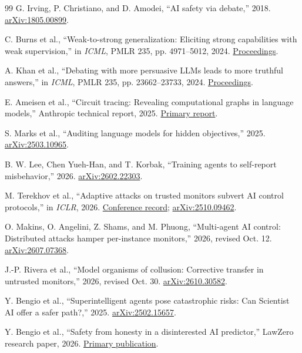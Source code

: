 \documentclass[10pt,twocolumn,letterpaper]{article}
\begin{document}
\begin{thebibliography}{99}
 G. Irving, P. Christiano, and D. Amodei, ``AI safety via debate,'' 2018. \href{https://arxiv.org/abs/1805.00899}{arXiv:1805.00899}.

 C. Burns et al., ``Weak-to-strong generalization: Eliciting strong capabilities with weak supervision,'' in \emph{ICML}, PMLR 235, pp. 4971--5012, 2024. \href{https://proceedings.mlr.press/v235/burns24b.html}{Proceedings}.

 A. Khan et al., ``Debating with more persuasive LLMs leads to more truthful answers,'' in \emph{ICML}, PMLR 235, pp. 23662--23733, 2024. \href{https://proceedings.mlr.press/v235/khan24a.html}{Proceedings}.

 E. Ameisen et al., ``Circuit tracing: Revealing computational graphs in language models,'' Anthropic technical report, 2025. \href{https://transformer-circuits.pub/2025/attribution-graphs/methods.html}{Primary report}.

 S. Marks et al., ``Auditing language models for hidden objectives,'' 2025. \href{https://arxiv.org/abs/2503.10965}{arXiv:2503.10965}.

 B. W. Lee, Chen Yueh-Han, and T. Korbak, ``Training agents to self-report misbehavior,'' 2026. \href{https://arxiv.org/abs/2602.22303}{arXiv:2602.22303}.

 M. Terekhov et al., ``Adaptive attacks on trusted monitors subvert AI control protocols,'' in \emph{ICLR}, 2026. \href{https://openreview.net/forum?id=wSs1Ez3aKl}{Conference record}; \href{https://arxiv.org/abs/2510.09462}{arXiv:2510.09462}.

 O. Makins, O. Angelini, Z. Shams, and M. Phuong, ``Multi-agent AI control: Distributed attacks hamper per-instance monitors,'' 2026, revised Oct. 12. \href{https://arxiv.org/abs/2607.07368}{arXiv:2607.07368}.

 J.-P. Rivera et al., ``Model organisms of collusion: Corrective transfer in untrusted monitors,'' 2026, revised Oct. 30. \href{https://arxiv.org/abs/2610.30582}{arXiv:2610.30582}.

 Y. Bengio et al., ``Superintelligent agents pose catastrophic risks: Can Scientist AI offer a safer path?,'' 2025. \href{https://arxiv.org/abs/2502.15657}{arXiv:2502.15657}.

 Y. Bengio et al., ``Safety from honesty in a disinterested AI predictor,'' LawZero research paper, 2026. \href{https://lawzero.org/en/publication/safety-honesty-disinterested-ai-predictor}{Primary publication}.


\end{thebibliography}
\end{document}
